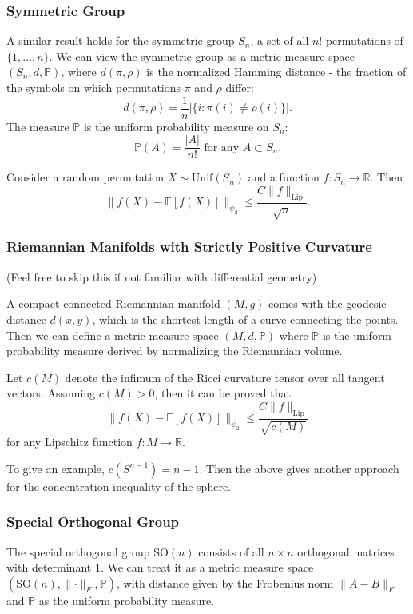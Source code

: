 \subsubsection{Symmetric Group}
A similar result holds for the symmetric group $S_n$, a set of all $n!$ permutations of $\{1, \dots, n\}$. 
We can view the symmetric group as a metric measure space $(S_n, d, \mathbb{P})$, where $d(\pi, \rho)$ is the 
normalized Hamming distance - the fraction of the symbols on which permutations $\pi$ and $\rho$ differ:
\[ d(\pi, \rho) = \frac{1}{n} |\{i: \pi(i) \neq \rho(i)\}|. \]
The measure $\mathbb{P}$ is the uniform probability measure on $S_n$:
\[ \mathbb{P}(A) = \frac{|A|}{n!} \text{ for any } A \subset S_n. \]

\begin{theorem}
\label{thm:5.2.6}
Consider a random permutation $X \sim \mathrm{Unif}(S_n)$ and a function $f: S_n \to \mathbb{R}$. Then 
\[ \lVert f(X) - \mathbb{E}[f(X)] \rVert_{\psi_2} \leq \frac{C \lVert f \rVert_{\mathrm{Lip}}}{\sqrt{n}}. \]
\end{theorem}


\subsubsection{Riemannian Manifolds with Strictly Positive Curvature}
(Feel free to skip this if not familiar with differential geometry)

A compact connected Riemannian manifold $(M, g)$ comes with the geodesic distance $d(x, y)$, which is the 
shortest length of a curve connecting the points. Then we can define a metric measure space $(M, d, \mathbb{P})$ 
where $\mathbb{P}$ is the uniform probability measure derived by normalizing the Riemannian volume. 

Let $c(M)$ denote the infimum of the Ricci curvature tensor over all tangent vectors. Assuming $c(M) > 0$, then 
it can be proved that 
\[ \lVert f(X) - \mathbb{E}[f(X)] \rVert_{\psi_2} \leq \frac{C \lVert f \rVert_{\mathrm{Lip}}}{\sqrt{c(M)}} \]
for any Lipschitz function $f: M \to \mathbb{R}$.

To give an example, $c(S^{n - 1}) = n - 1$. Then the above gives another approach for the concentration 
inequality of the sphere.


\subsubsection{Special Orthogonal Group}
The special orthogonal group $\mathrm{SO}(n)$ consists of all $n \times n$ orthogonal matrices with determinant 
1. We can treat it as a metric measure space $(\mathrm{SO}(n), \lVert \cdot \rVert_{F}, \mathbb{P})$, with 
distance given by the Frobenius norm $\lVert A - B \rVert_{F}$ and $\mathbb{P}$ as the uniform probability 
measure.

